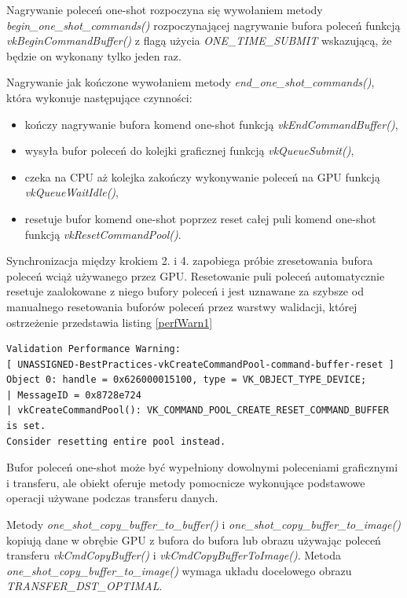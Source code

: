 Nagrywanie poleceń one-shot rozpoczyna się wywołaniem metody \textit{begin\_one\_shot\_commands()} rozpoczynającej nagrywanie bufora poleceń funkcją \textit{vkBeginCommandBuffer()} z flagą użycia \textit{ONE\_TIME\_SUBMIT} wskazującą, że będzie on wykonany tylko jeden raz.

Nagrywanie jak kończone wywołaniem metody \textit{end\_one\_shot\_commands()}, która wykonuje następujące czynności:
\begin{itemize}
	\item kończy nagrywanie bufora komend one-shot funkcją \textit{vkEndCommandBuffer()},
	\item wysyła bufor poleceń do kolejki graficznej funkcją \textit{vkQueueSubmit()},
	\item czeka na CPU aż kolejka zakończy wykonywanie poleceń na GPU funkcją \textit{vkQueueWaitIdle()},
	\item resetuje bufor komend one-shot poprzez reset całej puli komend one-shot funkcją \textit{vkResetCommandPool()}.
\end{itemize}
Synchronizacja między krokiem 2. i 4. zapobiega próbie zresetowania bufora poleceń wciąż używanego przez GPU. Resetowanie puli poleceń automatycznie resetuje zaalokowane z niego bufory poleceń i jest uznawane za szybsze od manualnego resetowania buforów poleceń przez warstwy walidacji, której ostrzeżenie przedstawia listing \ref{perfWarn1}
\lstset{language=verbatim}
\begin{lstlisting}[caption={Ostrzeżenie wydajnościowe wyemitowane przez warstwy walidacji},captionpos=b,label={perfWarn1}]
Validation Performance Warning:
[ UNASSIGNED-BestPractices-vkCreateCommandPool-command-buffer-reset ]
Object 0: handle = 0x626000015100, type = VK_OBJECT_TYPE_DEVICE;
| MessageID = 0x8728e724
| vkCreateCommandPool(): VK_COMMAND_POOL_CREATE_RESET_COMMAND_BUFFER is set.
Consider resetting entire pool instead.
\end{lstlisting}

Bufor poleceń one-shot może być wypełniony dowolnymi poleceniami graficznymi i transferu, ale obiekt oferuje metody pomocnicze wykonujące podstawowe operacji używane podczas transferu danych.

Metody \textit{one\_shot\_copy\_buffer\_to\_buffer()} i \textit{one\_shot\_copy\_buffer\_to\_image()} kopiują dane w obrębie GPU z bufora do bufora lub obrazu używając poleceń transferu \textit{vkCmdCopyBuffer()} i \textit{vkCmdCopyBufferToImage()}. Metoda \textit{one\_shot\_copy\_buffer\_to\_image()} wymaga układu docelowego obrazu \textit{TRANSFER\_DST\_OPTIMAL}.


